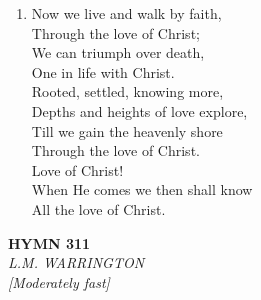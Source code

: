 \begin{enumerate}
    \item Now we live and walk by faith, \\
        Through the love of Christ; \\
        We can triumph over death, \\
        One in life with Christ. \\
        Rooted, settled, knowing more, \\
        Depths and heights of love explore, \\
        Till we gain the heavenly shore \\
        Through the love of Christ. \\
        Love of Christ! \\
        When He comes we then shall know \\
        All the love of Christ.

\end{enumerate}

\newpage
\begin{center}
    {\Large \textbf{HYMN 311}}
    \\
    \textit{L.M. WARRINGTON}
    \\
    \textit{\small [Moderately fast]}
\end{center}
\vspace{1em}

